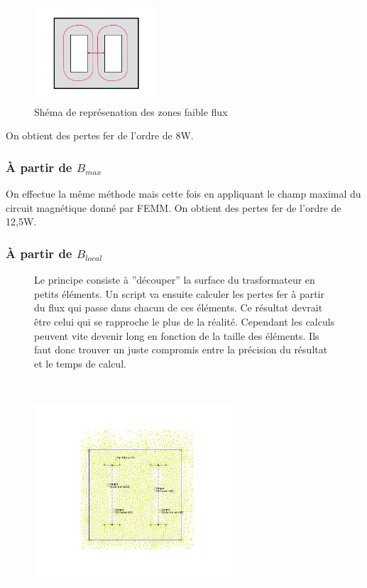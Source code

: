 \begin{figure}[ht]
	\begin{center}
	\includegraphics[width=0.4\textwidth]{images/TP3_repartission_Bmoy}
	\caption{Shéma de représenation des zones faible flux}\label{img:RepChampsBmoy}
	\end{center}
\end{figure}
\FloatBarrier

On obtient des pertes fer de l'ordre de 8W. 


\subsubsection{À partir de $B_{max}$}

On effectue la même méthode mais cette fois en appliquant le champ maximal du circuit magnétique donné par FEMM. On obtient des pertes fer de l'ordre de 12,5W.  


\subsubsection{À partir de $B_{local}$}
\vspace{-10px}
\begin{figure}[ht]
\centering
\begin{minipage}{.5\textwidth}  
Le principe consiste à ''découper'' la surface du trasformateur en petits éléments. Un script va ensuite calculer les pertes fer à partir du flux qui passe dans chacun de ces éléments. Ce résultat devrait être celui qui se rapproche le plus de la réalité. Cependant les calculs peuvent vite devenir long en fonction de la taille des éléments. Ils faut donc trouver un juste compromis entre la précision du résultat et le temps de calcul. 
\end{minipage}~
\begin{minipage}{.5\textwidth}
 \centering
\includegraphics[height=250px]{images/TP3_mesh}  
\end{minipage}
\end{figure}
\FloatBarrier
\vspace{20px}
	


